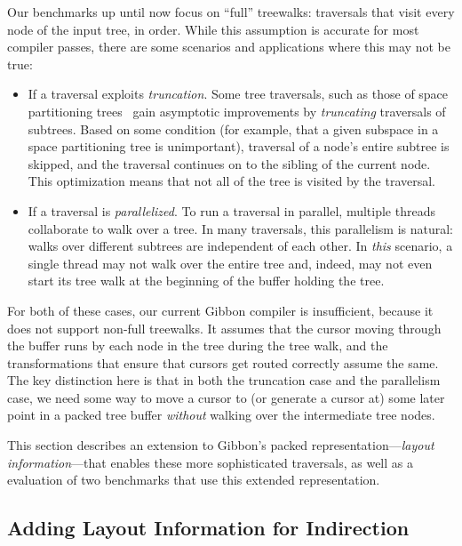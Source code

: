 \documentclass[a4paper,english]{lipics-v2016}
\newcommand{\treelang}{Gibbon\xspace} %
\begin{document}
Our benchmarks up until now focus on ``full'' treewalks: traversals that visit
every node of the input tree, in order. While this assumption is accurate for
most compiler passes, there are some scenarios and applications where this may
not be true:
\begin{itemize}
  \item If a traversal exploits {\em truncation}. Some tree traversals, such as those of space partitioning trees~\cite{gray2000n} gain asymptotic improvements by {\em truncating} traversals of subtrees. Based on some condition (for example, that a given subspace in a space partitioning tree is unimportant), traversal of a node's entire subtree is skipped, and the traversal continues on to the sibling of the current node. This optimization means that not all of the tree is visited by the traversal.
  \item If a traversal is {\em parallelized}. To run a traversal in parallel, multiple threads collaborate to walk over a tree. In many traversals, this parallelism is natural: walks over different subtrees are independent of each other. In {\em this} scenario, a single thread may not walk over the entire tree and, indeed, may not even start its tree walk at the beginning of the buffer holding the tree.
\end{itemize}

For both of these cases, our current \treelang{} compiler is insufficient,
because it does not support non-full treewalks. It assumes that the
cursor moving through the buffer runs by each node in the tree during the tree
walk, and the transformations that ensure that cursors get routed correctly
assume the same. The key distinction here is that in both the truncation case
and the parallelism case, we need some way to move a cursor to (or generate a
cursor at) some later point in a packed tree buffer {\em without} walking over
the intermediate tree nodes.

This section describes an extension to \treelang{}'s packed representation---{\em layout information}---that enables these more sophisticated traversals, as well as a evaluation of two benchmarks that use this extended representation.

\subsection{Adding Layout Information for Indirection}
\end{document}
